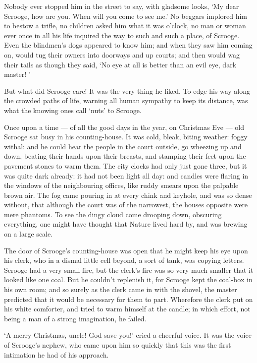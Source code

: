 \documentclass[11pt,twoside]{article}\makeatletter
\begin{document}
Nobody ever stopped him in the street to say, with gladsome looks, ‘My dear Scrooge, how are you.  When will you come to see me.’  No beggars implored him to bestow a trifle, no children asked him what it was o'clock, no man or woman ever once in all his life inquired the way to such and such a place, of Scrooge.  Even the blindmen's dogs appeared to know him; and when they saw him coming on, would tug their owners into doorways  and up courts; and then would wag their tails as though they said, ‘No eye at all is better than an evil eye, dark master! ’  \par
But what did Scrooge care!  It was the very thing he liked.  To edge his way along the crowded paths of life, warning all human sympathy to keep its distance, was what the knowing ones call ‘nuts’ to Scrooge.  \par
Once upon a time — of all the good days in the year, on Christmas Eve — old Scrooge sat busy in his counting-house. It was cold, bleak, biting weather: foggy withal: and he could hear the people in the court outside, go wheezing up and down, beating their hands upon their breasts, and stamping their feet upon the pavement stones to warm them. The city clocks had only just gone three, but it was quite dark already: it had not been light all day: and candles were flaring in the windows of the neighbouring offices, like ruddy smears upon the palpable brown air.  The fog came pouring in at every chink and keyhole, and was so dense without, that although the court was of the   narrowest, the houses opposite were mere phantoms.  To see the dingy cloud come drooping down, obscuring everything, one might have thought that Nature lived hard by, and was brewing on a large scale.  \par
The door of Scrooge's counting-house was open that he might keep his eye upon his clerk, who in a dismal little cell beyond, a sort of tank, was copying letters.  Scrooge had a very small fire, but the clerk's fire was so very much smaller that it looked like one coal.  But he couldn't replenish it, for Scrooge kept the coal-box in his own room; and so surely as the clerk came in with the shovel, the master predicted that it would be necessary for them to part.  Wherefore the clerk put on his white comforter, and tried to warm himself at the candle; in which effort, not being a man of a strong imagination, he failed.  \par
‘A merry Christmas, uncle!  God save you!’ cried a cheerful voice.  It was the voice of Scrooge's nephew, who came upon him so quickly that this was the first intimation he had of his approach.   \par
\end{document}
